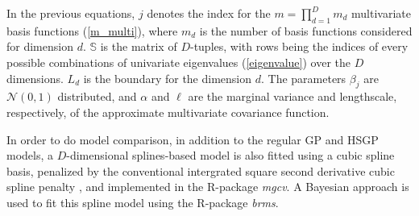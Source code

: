 \documentclass[]{interact}
\theoremstyle{plain}%
\theoremstyle{definition}
\theoremstyle{remark}
\begin{document}
\noindent In the previous equations, $j$ denotes the index for the $m= \prod_{d=1}^{D} m_d$ multivariate basis functions (\ref{m_multi}), where $m_d$ is the number of basis functions considered for dimension $d$. $\mathbb{S}$ is the matrix of $D$-tuples, with rows being the indices of every possible combinations of univariate eigenvalues (\ref{eigenvalue}) over the $D$ dimensions. $L_d$ is the boundary for the dimension $d$. The parameters $\beta_j$ are $\mathcal{N}(0,1)$ distributed, and $\alpha$ and $\ell$ are the marginal variance and lengthscale, respectively, of the approximate multivariate covariance function.

In order to do model comparison, in addition to the regular GP and HSGP models, a $D$-dimensional splines-based model is also fitted using a cubic spline basis, penalized by the conventional intergrated square second derivative cubic spline penalty \citep{wood2017generalized}, and implemented in the R-package \textit{mgcv}. A Bayesian approach is used to fit this spline model using the R-package \textit{brms}.
\end{document}
